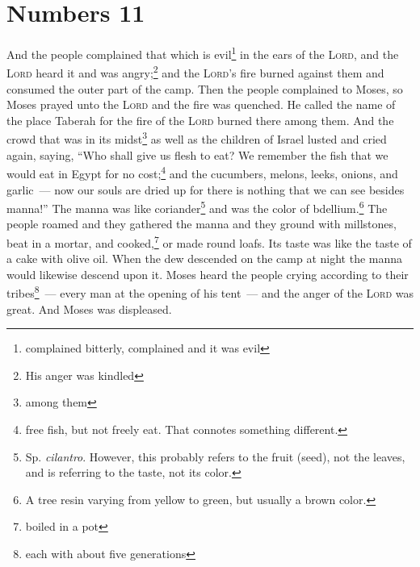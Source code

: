 \section{Numbers 11}\label{Numbers 11}
\begin{enumerate}[align=center]
     And the people complained that which is evil\footnote{complained bitterly, complained and it was evil} in the ears of the \textsc{Lord}, and the \textsc{Lord} heard it and was angry;\footnote{His anger was kindled} and the \textsc{Lord}'s fire burned against them and consumed the outer part of the camp.%
     Then the people complained to Moses, so Moses prayed unto the \textsc{Lord} and the fire was quenched.%
     He called the name of the place Taberah for the fire of the \textsc{Lord} burned there among them.%
     And the crowd that was in its midst\footnote{among them} as well as the children of Israel lusted and cried again, saying, ``Who shall give us flesh to eat?%
     We remember the fish that we would eat in Egypt for no cost;\footnote{free fish, but not freely eat. That connotes something different.} and the cucumbers, melons, leeks, onions, and garlic~---%
     now our souls are dried up for there is nothing that we can see besides manna!''%
     The manna was like coriander\footnote{Sp. \emph{cilantro}. However, this probably refers to the fruit (seed), not the leaves, and is referring to the taste, not its color.} and was the color of bdellium.\footnote{A tree resin varying from yellow to green, but usually a brown color.}%
     The people roamed and they gathered the manna and they ground with millstones, beat in a mortar, and cooked,\footnote{boiled in a pot} or made round loafs. Its taste was like the taste of a cake with olive oil.%
     When the dew descended on the camp at night the manna would likewise descend upon it.%
     Moses heard the people crying according to their tribes\footnote{each with about five generations}~--- every man at the opening of his tent~--- and the anger of the \textsc{Lord} was great. And Moses was displeased.%

\end{enumerate}

